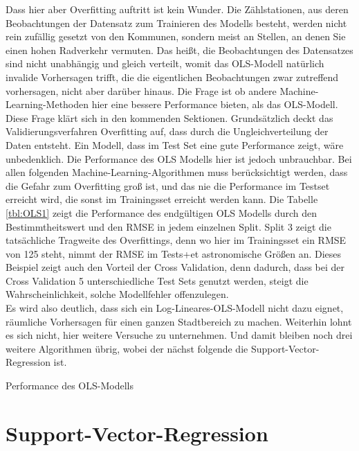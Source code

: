 \documentclass[a4paper,12pt]{thesis}
\begin{document}
Dass hier aber Overfitting auftritt ist kein Wunder. Die Zählstationen, aus deren Beobachtungen der Datensatz zum Trainieren des Modells besteht, werden nicht rein zufällig gesetzt von den Kommunen, sondern meist an Stellen, an denen Sie einen hohen Radverkehr vermuten. Das heißt, die Beobachtungen des Datensatzes sind nicht unabhängig und gleich verteilt, womit das OLS-Modell natürlich invalide Vorhersagen trifft, die die eigentlichen Beobachtungen zwar zutreffend vorhersagen, nicht aber darüber hinaus. Die Frage ist ob andere Machine-Learning-Methoden hier eine bessere Performance bieten, als das OLS-Modell. Diese Frage klärt sich in den kommenden Sektionen. Grundsätzlich deckt das Validierungsverfahren Overfitting auf, dass durch die Ungleichverteilung der Daten entsteht. Ein Modell, dass im Test Set eine gute Performance zeigt, wäre unbedenklich. Die Performance des OLS Modells hier ist jedoch unbrauchbar. Bei allen folgenden Machine-Learning-Algorithmen muss berücksichtigt werden, dass die Gefahr zum Overfitting groß ist, und das nie die Performance im Testset erreicht wird, die sonst im Trainingsset erreicht werden kann. Die Tabelle \ref{tbl:OLS1} zeigt die Performance des endgültigen OLS Modells durch den Bestimmtheitswert und den RMSE in jedem einzelnen Split. Split 3 zeigt die tatsächliche Tragweite des Overfittings, denn wo hier im Trainingsset ein RMSE von 125 steht, nimmt der RMSE im Tests+et astronomische Größen an. Dieses Beispiel zeigt auch den Vorteil der Cross Validation, denn dadurch, dass bei der Cross Validation 5 unterschiedliche Test Sets genutzt werden, steigt die Wahrscheinlichkeit, solche Modellfehler offenzulegen.\\
Es wird also deutlich, dass sich ein Log-Lineares-OLS-Modell nicht dazu eignet, räumliche Vorhersagen für einen ganzen Stadtbereich zu machen. Weiterhin lohnt es sich nicht, hier weitere Versuche zu unternehmen. Und damit bleiben noch drei weitere Algorithmen übrig, wobei der nächst folgende die Support-Vector-Regression ist.

\begin{table}
	\caption{Performance des OLS-Modells}
	\label{tbl:OLS1}
\end{table}

\section{Support-Vector-Regression}
\end{document}
